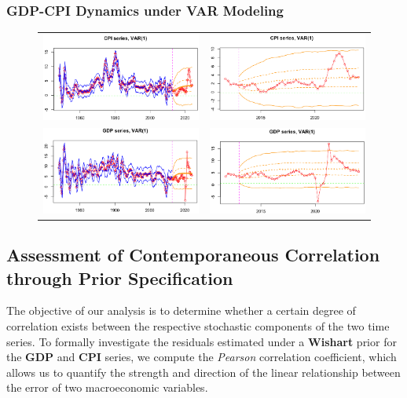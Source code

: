 \documentclass{Configuration_Files/PoliMi3i_thesis}
\begin{document}
\subsubsection{GDP-CPI Dynamics under VAR Modeling}
\begin{figure}[H]
  \centering
  \begin{tabular}{@{}cc@{}}
    \includegraphics[angle=90,width=0.35\linewidth]{VAR(1)-33.png} &
    \includegraphics[angle=90,width=0.35\linewidth]{VAR(1)-44.png} \\
    \includegraphics[angle=90,width=0.35\linewidth]{VAR(1)-11.png} &
    \includegraphics[angle=90,width=0.35\linewidth]{VAR(1)-22.png}
  \end{tabular}
\end{figure}



\subsection*{Assessment of Contemporaneous Correlation through Prior Specification}

The objective of our analysis is to determine whether a certain degree of correlation exists between the respective stochastic components of the two time series. To formally investigate the residuals estimated under a \textbf{\textbf{Wishart}} prior for the \textbf{GDP} and \textbf{CPI} series, we compute the \textit{Pearson} correlation coefficient, which allows us to quantify the strength and direction of the linear relationship between the error of two macroeconomic variables.
\label{Prior-VAR}
\end{document}
